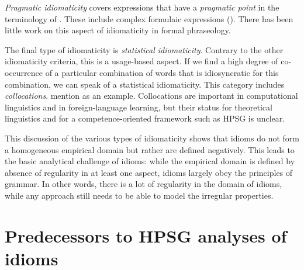 \documentclass[output=paper
	        ,collection
	        ,collectionchapter
 	        ,biblatex
                ,babelshorthands
                ,newtxmath
                ,draftmode
                ,colorlinks, citecolor=brown
]{langscibook}
\begin{document}
\emph{Pragmatic idiomaticity} covers expressions that have a \emph{pragmatic point} in the terminology of \citet{FKoC88a}. These include complex formulaic expressions (). There has been little work on this aspect of idiomaticity in formal phraseology.

The final type of idiomaticity is \emph{statistical idiomaticity}. 
Contrary to the other idiomaticity criteria, this is a usage-based aspect. If we find a high degree of co-occurrence of a particular combination of words that is idiosyncratic for this combination, we can speak of a statistical idiomaticity. This category includes \emph{collocations}. \citet{Baldwin:Kim:10} mention  as an example. Collocations are important in computational linguistics and in foreign-language learning, but their status for theoretical linguistics and for a competence-oriented framework such as HPSG is unclear. 

This discussion of the various types of idiomaticity shows that idioms do not form a homogeneous empirical domain but rather are defined negatively. 
This leads to the basic analytical challenge of idioms: while the empirical domain is defined by  absence of regularity in at least one aspect, idioms largely obey the principles of grammar. 
In other words, there is a lot of regularity in the domain of idioms, while any approach still needs to be able to model the irregular properties. 






\section{Predecessors to HPSG analyses of idioms}
\label{Sec-Predecessors}
\end{document}
